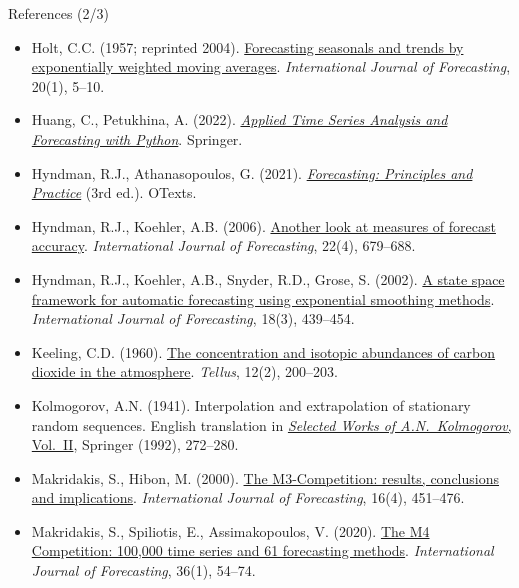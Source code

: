 \begin{frame}{References (2/3)}
\itemsize{\scriptsize}
\begin{itemize}
    \item Holt, C.C. (1957; reprinted 2004). \href{https://doi.org/10.1016/j.ijforecast.2003.09.015}{Forecasting seasonals and trends by exponentially weighted moving averages}. \emph{International Journal of Forecasting}, 20(1), 5--10.
    \item Huang, C., Petukhina, A. (2022). \href{https://doi.org/10.1007/978-3-031-13584-2}{\emph{Applied Time Series Analysis and Forecasting with Python}}. Springer.
    \item Hyndman, R.J., Athanasopoulos, G. (2021). \href{https://otexts.com/fpp3/}{\emph{Forecasting: Principles and Practice}} (3rd ed.). OTexts.
    \item Hyndman, R.J., Koehler, A.B. (2006). \href{https://doi.org/10.1016/j.ijforecast.2006.03.001}{Another look at measures of forecast accuracy}. \emph{International Journal of Forecasting}, 22(4), 679--688.
    \item Hyndman, R.J., Koehler, A.B., Snyder, R.D., Grose, S. (2002). \href{https://doi.org/10.1016/S0169-2070(01)00110-8}{A state space framework for automatic forecasting using exponential smoothing methods}. \emph{International Journal of Forecasting}, 18(3), 439--454.
    \item Keeling, C.D. (1960). \href{https://doi.org/10.3402/tellusa.v12i2.9366}{The concentration and isotopic abundances of carbon dioxide in the atmosphere}. \emph{Tellus}, 12(2), 200--203.
    \item Kolmogorov, A.N. (1941). Interpolation and extrapolation of stationary random sequences. English translation in \href{https://doi.org/10.1007/978-94-011-2260-3_28}{\emph{Selected Works of A.N.\ Kolmogorov}, Vol.\ II}, Springer (1992), 272--280.
    \item Makridakis, S., Hibon, M. (2000). \href{https://doi.org/10.1016/S0169-2070(00)00057-1}{The M3-Competition: results, conclusions and implications}. \emph{International Journal of Forecasting}, 16(4), 451--476.
    \item Makridakis, S., Spiliotis, E., Assimakopoulos, V. (2020). \href{https://doi.org/10.1016/j.ijforecast.2019.04.014}{The M4 Competition: 100,000 time series and 61 forecasting methods}. \emph{International Journal of Forecasting}, 36(1), 54--74.
\end{itemize}
\end{frame}

